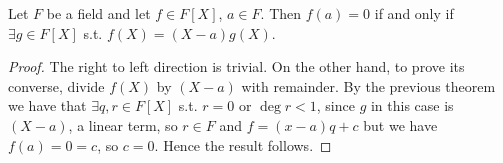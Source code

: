 \begin{corollary}
  Let $F$ be a field and let $f\in F[X]$, $a\in F$. Then $f(a)=0$ if and only if $\exists
  g\in F[X]$ s.t. $f(X)=(X-a)g(X)$.
  \label{<+label+>}
\end{corollary}
\begin{proof}
  The right to left direction is trivial. On the other hand, to prove its converse, divide
  $f(X)$ by $(X-a)$ with remainder. By the previous theorem we have that $\exists q,r\in
  F[X]$ s.t. $r=0$ or $\deg r <1$, since $g$ in this case is $(X-a)$, a linear term, so
  $r\in F$ and $f = (x-a)q+c$ but we have $f(a)=0=c$, so $c=0$. Hence the result follows.
\end{proof}
